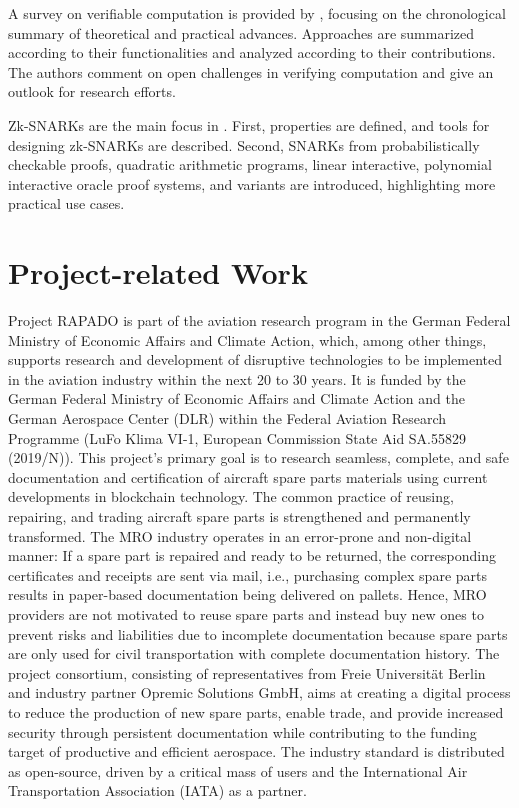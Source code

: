 A survey on verifiable computation is provided by \citet{Ahmad}, focusing on the chronological summary of theoretical and practical advances. Approaches are summarized according to their functionalities and analyzed according to their contributions. The authors comment on open challenges in verifying computation and give an outlook for research efforts. 

Zk-SNARKs are the main focus in \citet{NitulescuGentleIntroSNARKs}. First, properties are defined, and tools for designing zk-SNARKs are described. Second, SNARKs from probabilistically checkable proofs, quadratic arithmetic programs, linear interactive, polynomial interactive oracle proof systems, and variants are introduced, highlighting more practical use cases. 

\section{Project-related Work}

Project RAPADO is part of the aviation research program in the German Federal Ministry of Economic Affairs and Climate Action, which, among other things, supports research and development of disruptive technologies to be implemented in the aviation industry within the next 20 to 30 years. It is funded by the German Federal Ministry of Economic Affairs and Climate Action and the German Aerospace Center (DLR) within the Federal Aviation Research Programme (LuFo Klima VI-1, European Commission State Aid SA.55829 (2019/N)). This project's primary goal is to research seamless, complete, and safe documentation and certification of aircraft spare parts materials using current developments in blockchain technology. The common practice of reusing, repairing, and trading aircraft spare parts is strengthened and permanently transformed. The MRO industry operates in an error-prone and non-digital manner: If a spare part is repaired and ready to be returned, the corresponding certificates and receipts are sent via mail, i.e., purchasing complex spare parts results in paper-based documentation being delivered on pallets. Hence, MRO providers are not motivated to reuse spare parts and instead buy new ones to prevent risks and liabilities due to incomplete documentation because spare parts are only used for civil transportation with complete documentation history. The project consortium, consisting of representatives from Freie Universit{\"a}t Berlin and industry partner Opremic Solutions GmbH, aims at creating a digital process to reduce the production of new spare parts, enable trade, and provide increased security through persistent documentation while contributing to the funding target of productive and efficient aerospace. The industry standard is distributed as open-source, driven by a critical mass of users and the International Air Transportation Association (IATA) as a partner.

